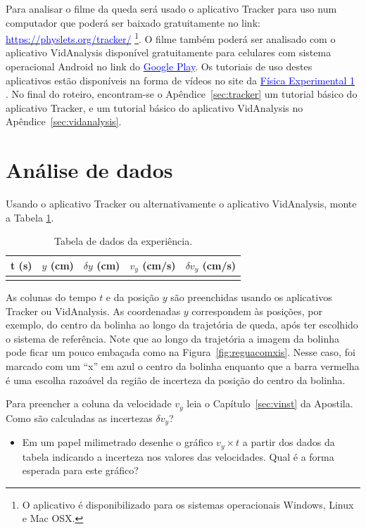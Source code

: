 Para analisar o filme da queda será usado o aplicativo Tracker para uso num computador 
que poderá ser baixado gratuitamente no link: 
\href{https://physlets.org/tracker/}{\textcolor {blue}
{https://physlets.org/tracker/}}
\footnote {O aplicativo é disponibilizado para os sistemas operacionais Windows, Linux e Mac OSX.}. 
O filme também poderá ser analisado com o aplicativo VidAnalysis disponível gratuitamente para celulares com sistema operacional Android no link  do
\href{https://play.google.com/store/apps/details?id=com.vidanalysis.free}{\textcolor {blue}
{Google Play}}. 
Os tutoriais de uso destes aplicativos estão disponíveis na forma de vídeos no site da \href{https://fisexp1.if.ufrj.br}{\textcolor {blue} {Física Experimental 1}} . 
No final do roteiro, encontram-se o Apêndice~\ref{sec:tracker} um tutorial básico do aplicativo Tracker, e um tutorial básico do aplicativo VidAnalysis no Apêndice~\ref{sec:vidanalysis}.  


\section{Análise de dados}
Usando o aplicativo Tracker ou alternativamente o aplicativo  VidAnalysis, monte a Tabela \ref{tabela1}.
\begin{table}[h]
\centering
\begin{tabular}{c|c|c|c|c}
t (s) & $y$ (cm) & $\delta y$ (cm)& $v_y$ (cm/s)& $\delta v_y$ (cm/s)\\
\hline 
&&&&  
\end{tabular}
\caption{Tabela de dados da experiência.}
\label{tabela1}
\end{table}
As colunas do tempo $t$ e da posição $y$ são preenchidas usando os aplicativos Tracker ou  VidAnalysis. As coordenadas $y$ correspondem às posições, por exemplo, do centro da bolinha ao longo da trajetória de queda, após ter escolhido o sistema de referência. Note que ao longo da trajetória a imagem da bolinha pode ficar um pouco embaçada como na Figura~\ref{fig:reguacomxis}.
Nesse caso, foi marcado com um ``x''  em azul 
o centro da bolinha enquanto que a barra vermelha é uma escolha razoável da região de incerteza
da posição do centro da bolinha.  

Para preencher a coluna da velocidade $v_y$ leia o Capítulo~\ref{sec:vinst} da Apostila.
Como são calculadas as incertezas $\delta v_y$?
\begin{itemize}
\item Em um papel milimetrado desenhe o gráfico $v_y \times t$ a partir dos dados da tabela indicando 
a incerteza nos valores das velocidades. Qual é a forma esperada para este gráfico?
\end{itemize}

